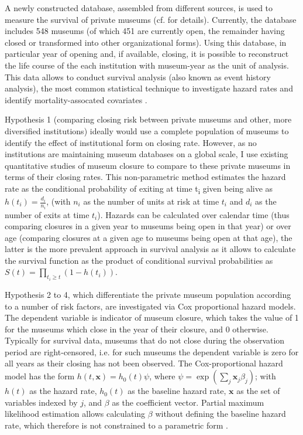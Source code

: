 \documentclass[12pt]{article}
\begin{document}
A newly constructed database, assembled from different sources, is used to measure the survival of private museums (cf. \textcite{Velthuis_etal_2023_boom} for details).
Currently, the database includes 548 museums (of which 451 are currently open, the remainder having closed or transformed into other organizational forms).
Using this database, in particular year of opening and, if available, closing, it is possible to reconstruct the life course of the each institution with museum-year as the unit of analysis.
This data allows to conduct survival analysis (also known as event history analysis), the most common statistical technique to investigate hazard rates and identify mortality-assocated covariates \parencite{Moore_2015_survival,Allison_2014_event}.



Hypothesis 1 (comparing closing risk between private museums and other, more diversified institutions) ideally would use a complete population of museums to identify the effect of institutional form on closing rate.
However, as no institutions are maintaining museum databases on a global scale, I use existing quantitative studies of museum closure to compare to these private museums in terms of their closing rates.
This non-parametric method estimates the hazard rate as the conditional probability of exiting at time t\textsubscript{i} given being alive as \(h(t_i) = \frac{d_i}{n_i}\), (with \(n_i\) as the number of units at risk at time \(t_i\) and \(d_i\) as the number of exits at time \(t_i\)).
Hazards can be calculated over calendar time (thus comparing closures in a given year to museums being open in that year) or over age (comparing closures at a given age to museums being open at that age), the latter is the more prevalent approach in survival analysis as it allows to calculate the survival function as the product of conditional survival probabilities as \(S(t) = \prod_{t_i \geq t} \left(1-h(t_i) \right)\).


Hypothesis 2 to 4, which differentiate the private museum population according to a number of risk factors, are investigated via Cox proportional hazard models. 
The dependent variable is indicator of museum closure, which takes the value of 1 for the museums which close in the year of their closure, and 0 otherwise.
Typically for survival data, museums that do not close during the observation period are right-censored, i.e. for such museums the dependent variable is zero for all years as their closing has not been observed.
The Cox-proportional hazard model has the form \(h(t,\mathbf{x}) = h_0(t) \psi\), where \(\psi = \exp(\sum_{j} \mathbf{x}_j \beta_j)\); with \(h(t)\) as the hazard rate, \(h_0(t)\) as the baseline hazard rate, \(\mathbf{x}\) as the set of variables indexed by \(j\), and \(\beta\) as the coefficient vector.
Partial maximum likelihood estimation allows calculating \(\beta\) without defining the baseline hazard rate, which therefore is not constrained to a parametric form \parencite{Moore_2015_survival}.
\end{document}
